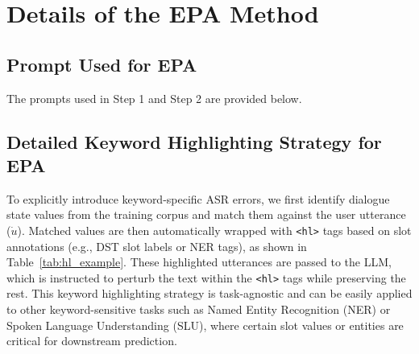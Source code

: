 



% 


\section{Details of the EPA Method}






\subsection{Prompt Used for EPA}
\label{app:prompt}
The prompts used in Step 1 and Step 2 are provided below.






\subsection{Detailed Keyword Highlighting Strategy for EPA}


To explicitly introduce keyword-specific ASR errors, we first identify dialogue state values from the training corpus and match them against the user utterance ($\dot{u}$). Matched values are then automatically wrapped with \texttt{<hl>} tags based on slot annotations (e.g., DST slot labels or NER tags), as shown in Table~\ref{tab:hl_example}. These highlighted utterances are passed to the LLM, which is instructed to perturb the text within the \texttt{<hl>} tags while preserving the rest. This keyword highlighting strategy is task-agnostic and can be easily applied to other keyword-sensitive tasks such as Named Entity Recognition (NER) or Spoken Language Understanding (SLU), where certain slot values or entities are critical for downstream prediction.

